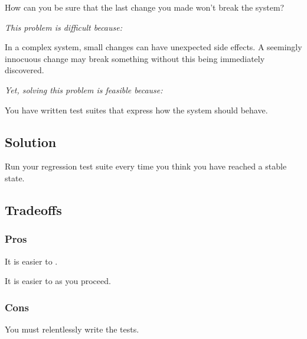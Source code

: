 \documentclass[a4paper,10pt,twoside]{book}
\begin{document}
How can you be sure that the last change you made won't break the system?

\emph{This problem is difficult because:} 

\begin{bulletlist}
\item In a complex system, small changes can have unexpected side effects. A seemingly innocuous change may break something without this being immediately discovered.
\end{bulletlist}

\emph{Yet, solving this problem is feasible because:}

\begin{bulletlist}
\item You have written test suites that express how the system should behave.
\end{bulletlist}

\subsection*{Solution}

Run your regression test suite every time you think you have reached a stable state.

\subsection*{Tradeoffs}

\subsubsection*{Pros}

\begin{bulletlist}
\item It is easier to .

\item It is easier to  as you proceed.
\end{bulletlist}

\subsubsection*{Cons}

\begin{bulletlist}
\item You must relentlessly write the tests. 
\end{bulletlist}
\end{document}
